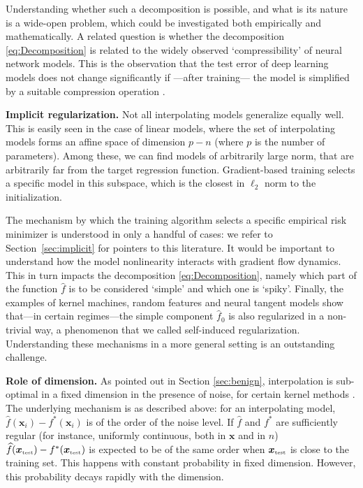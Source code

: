   Understanding whether such a decomposition  is possible, and what is its nature is a wide-open problem, which could be investigated both empirically and mathematically. A related question is whether the decomposition  \eqref{eq:Decomposition}
  is related to the widely observed `compressibility' of neural network models. This is the observation that the test error of deep learning models does not change significantly if ---after training--- the model is simplified by a suitable compression operation \cite{han2015deep}.

{\bf Implicit regularization.} Not all interpolating models generalize equally well. This is easily seen in the case of linear models, where the set of interpolating models forms an affine space of dimension $p-n$ (where $p$ is the number of parameters). Among these, we can find models of arbitrarily large norm, that are arbitrarily far from the target regression function. Gradient-based training selects a specific model in this subspace, which is the closest in $\ell_2$ norm to the initialization.  

  The  mechanism by which the training algorithm selects a specific empirical risk minimizer is understood in only a handful of cases: we refer to Section~\ref{sec:implicit} for pointers to this literature. It would be important to understand how the model nonlinearity interacts with gradient flow dynamics. This  in turn impacts the decomposition \eqref{eq:Decomposition}, namely which part of the function ${\widehat f}$ is to be considered `simple' and which one is `spiky'. Finally, the examples of kernel machines, random features and neural tangent models show that---in certain regimes---the simple component ${\widehat f}_0$ is also regularized in a non-trivial way, a phenomenon that we called self-induced regularization. Understanding these mechanisms in a more general setting is an outstanding challenge.

{\bf Role of dimension.} As pointed out in Section \ref{sec:benign}, interpolation is sub-optimal in a fixed dimension in the presence of noise, for certain kernel methods \cite{rakhlin2019consistency}. The underlying mechanism is as described above: for an interpolating model, ${\widehat f}({\boldsymbol x}_i) -f^*({\boldsymbol x}_i)$ is of the order of the noise level. If ${\widehat f}$ and $f^*$ are sufficiently regular (for instance, uniformly continuous, both in ${\boldsymbol x}$ and in $n$)
  ${\widehat f}({\boldsymbol x}_{\mbox{\tiny\rm test}}) -f^*({\boldsymbol x}_{\mbox{\tiny\rm test}})$ is expected to be of the same order when ${\boldsymbol x}_{\mbox{\tiny\rm test}}$ is close to the training set. This happens with constant probability in fixed dimension. However, this probability decays rapidly with the dimension.

